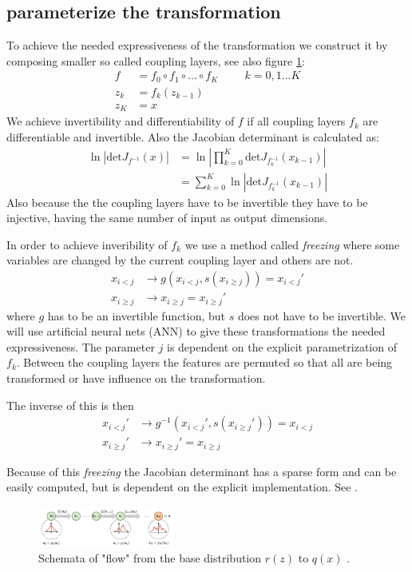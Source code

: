 \documentclass[%
 reprint,
 amsmath,amssymb,
 aps,
]{revtex4-2}
\begin{document}
\subsection{parameterize the transformation}
\label{sec:param trafo}
To achieve the needed expressiveness of the transformation we construct it by composing smaller so called coupling layers, see also figure \ref{fig:schemaFlow}:
\begin{align*}
	f &= f_0 \circ f_1 \circ ... \circ f_K \hspace{1cm} k=0,1...K \\
	z_k &= f_k(z_{k-1})\\
	z_K &= x
\end{align*}
We achieve invertibility and differentiability of $f$ if all coupling layers $f_k$ are differentiable and invertible. Also the Jacobian determinant is calculated as:
\begin{align*}
	\ln\left|\text{det}J_{f^{-1}}(x)\right| &= \ln\left|\prod_{k=0}^{K}\text{det}J_{f_{k}^{-1}}(x_{k-1})\right| \\
	&= \sum_{k=0}^{K}\ln\left|\text{det}J_{f_{k}^{-1}}(x_{k-1})\right|
\end{align*}
Also because the the coupling layers have to be invertible they have to be injective, having the same number of input as output dimensions. 

In order to achieve inveribility of $f_k$ we use a method called \textit{freezing} where some variables are changed by the current coupling layer and others are not. 
\begin{align*}
	x_{i<j} &\rightarrow g(x_{i<j},s(x_{i\geq j})) = 	x_{i<j}'\\
	x_{i\geq j} &\rightarrow x_{i\geq j} = x_{i\geq j}'
\end{align*}
where $g$ has to be an invertible function, but $s$ does not have to be invertible. We will use artificial neural nets (ANN) to give these transformations the needed expressiveness. The parameter $j$ is dependent on the explicit parametrization of $f_k$. Between the coupling layers the features are permuted so that all are being transformed or have influence on the transformation.

The inverse of this is then
\begin{align*}
	x_{i<j}' &\rightarrow g^{-1}(x_{i<j}',s(x_{i\geq j}')) = x_{i<j}\\
	x_{i\geq j}' &\rightarrow x_{i\geq j}' = x_{i\geq j}
\end{align*}

Because of this \textit{freezing} the Jacobian determinant has a sparse form and can be easily computed, but is dependent on the explicit implementation. See \cite{JMLR:v22:19-1028}.
 \begin{figure}[h]
	\centering
	\includegraphics[width=0.4\textwidth]{figs/normalizing_flow_layout.png}
	\caption{ Schemata of "flow" from the base distribution $r(z)$ to $q(x)$
		\label{fig:schemaFlow}. \cite{nfSchema}
	}
\end{figure}
\end{document}
